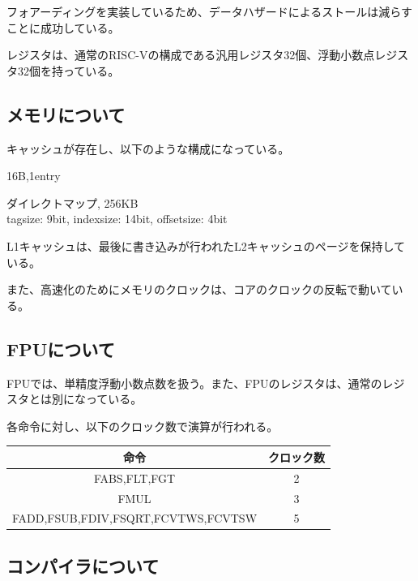 \documentclass[a4paper,11pt]{ltjsarticle}
\begin{document}
フォアーディングを実装しているため、データハザードによるストールは減らすことに成功している。

レジスタは、通常のRISC-Vの構成である汎用レジスタ32個、浮動小数点レジスタ32個を持っている。

\subsection*{メモリについて}

キャッシュが存在し、以下のような構成になっている。

\begin{description}[labelwidth=5em]
  \item[L1キャッシュ] 16B,1entry
  \item[L2キャッシュ] ダイレクトマップ, 256KB\\\hspace*{4em}
        tagsize: 9bit, indexsize: 14bit, offsetsize: 4bit
\end{description}
L1キャッシュは、最後に書き込みが行われたL2キャッシュのページを保持している。

また、高速化のためにメモリのクロックは、コアのクロックの反転で動いている。

\subsection*{FPUについて}

FPUでは、単精度浮動小数点数を扱う。また、FPUのレジスタは、通常のレジスタとは別になっている。

各命令に対し、以下のクロック数で演算が行われる。

\begin{table}[htb]
  \begin{center}
    \begin{tabular}{|c|c|} \hline
      命令                                 & クロック数 \\ \hline
      FABS,FLT,FGT                       & 2     \\ \hline
      FMUL                               & 3     \\ \hline
      FADD,FSUB,FDIV,FSQRT,FCVTWS,FCVTSW & 5     \\ \hline
    \end{tabular}
  \end{center}
\end{table}


\subsection*{コンパイラについて}
\end{document}
